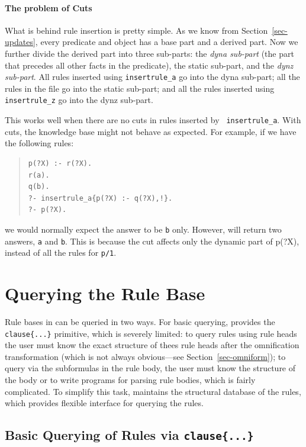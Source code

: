 \documentclass[11pt]{article}
\newcommand{\ERGO}{\mbox{\smaller{\ensuremath{\cal{E}}\smaller{{\sc{RGO}}}}}\xspace}
\newcommand{\FLSYSTEM}{\ERGO}
\begin{document}
\paragraph{The problem of Cuts} What is behind rule insertion is pretty
simple. As we know from Section~\ref{sec-updates}, every predicate and
object has a base part and a derived part. Now we further divide the
derived part into three sub-parts: the \emph{dyna sub-part} (the part that
precedes all other facts in the predicate), the static sub-part, and the
\emph{dynz sub-part}. All rules inserted using {\tt insertrule\_a} go into
the dyna sub-part; all the rules in the file go into the static
sub-part; and all the rules inserted using {\tt insertrule\_z} go into the
dynz sub-part.

This works well when there are no cuts in rules inserted by {\tt
  insertrule\_a}. With cuts, the knowledge base might not
behave as expected. For example, if we have the following rules:
\begin{quote}
\begin{verbatim}
p(?X) :- r(?X).
r(a).
q(b).
?- insertrule_a{p(?X) :- q(?X),!}.
?- p(?X).
\end{verbatim}
\end{quote}
\noindent
we would normally expect the answer to be {\tt b} only. However, \FLSYSTEM will
return two answers, {\tt a} and {\tt b}. This is because the cut affects
only the dynamic part of p(?X), instead of all the rules for {\tt p/1}.

\section{Querying the Rule Base}
\label{sec:clause}

Rule bases in \ERGO can be queried in two ways. For basic
querying, \ERGO provides the \texttt{clause\{...\}} primitive, which is
severely limited: to query rules 
using rule heads the user must know the exact structure of thees rule heads
after the omnification transformation (which is not always obvious---see
Section~\ref{sec-omniform}); to query via the subformulas in the rule
body, the user must know the structure of the body or to write programs
for parsing rule bodies, which is fairly complicated.
To simplify this task, \ERGO maintains the structural database of the
rules, which provides flexible interface for querying the rules.

\subsection{Basic Querying of Rules via \texttt{clause\{...\}}}
\end{document}
